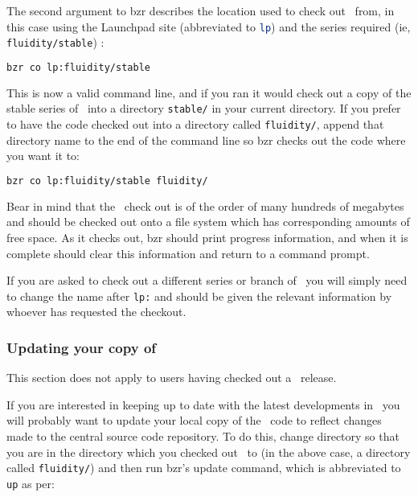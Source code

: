 The second argument to bzr describes the location used to check out \fluidity\
from, in this case using the Launchpad site (abbreviated to
\lstinline[language=Bash]+lp+) and the series required (ie,
\lstinline[language=Bash]+fluidity/stable+) :



\begin{lstlisting}[language=Bash]
bzr co lp:fluidity/stable
\end{lstlisting}

This is now a valid command line, and if you ran it would check out a copy of
the stable series of \fluidity\ into a directory
\lstinline[language=Bash]+stable/+ in your current directory. If you
prefer to have the code checked out into a directory called
\lstinline[language=Bash]+fluidity/+, append that directory name to the end of
the command line so bzr checks out the code where you want it to:

\begin{lstlisting}[language=Bash]
bzr co lp:fluidity/stable fluidity/
\end{lstlisting}

Bear in mind that the \fluidity\ check out is of the order of many hundreds of
megabytes and should be checked out onto a file system which has corresponding
amounts of free space. As it checks out, bzr should print progress information,
and when it is complete should clear this information and return to a command
prompt.

If you are asked to check out a different series or branch of \fluidity\ you
will simply need to change the name after \lstinline[language=Bash]+lp:+ and
should be given the relevant information by whoever has requested the checkout.

\subsubsection{Updating your copy of \fluidity}
\label{sec:subversion_updating}

This section does not apply to users having checked out a \fluidity\ release.

If you are interested in keeping up to date with the latest developments in
\fluidity\ you will probably want to update your local copy of the \fluidity\
code to reflect changes made to the central source code repository. To do this,
change directory so that you are in the directory which you checked out
\fluidity\ to (in the above case, a directory called
\lstinline[language=Bash]+fluidity/+) and then run bzr's update command, which
is abbreviated to \lstinline[language=Bash]+up+ as per:

